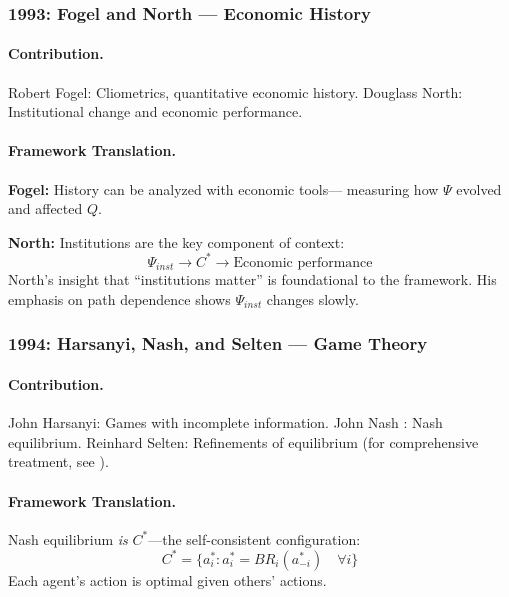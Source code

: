 \documentclass[12pt,a4paper]{article}
\begin{document}
\subsubsection{1993: Fogel and North --- Economic History}

\paragraph{Contribution.}
Robert Fogel: Cliometrics, quantitative economic history.
Douglass North: Institutional change and economic performance.

\paragraph{Framework Translation.}
\textbf{Fogel:} History can be analyzed with economic tools---
measuring how $\Psi$ evolved and affected $Q$.

\textbf{North:} Institutions are the key component of context:
\begin{equation}
  \Psi_{inst} \to C^* \to \text{Economic performance}
\end{equation}
North's insight that ``institutions matter'' is foundational to the framework.
His emphasis on path dependence shows $\Psi_{inst}$ changes slowly.

\subsubsection{1994: Harsanyi, Nash, and Selten --- Game Theory}

\paragraph{Contribution.}
John Harsanyi: Games with incomplete information.
John Nash \citep{nash1950}: Nash equilibrium.
Reinhard Selten: Refinements of equilibrium (for comprehensive treatment, see \citealt{fudenbergtirole1991}).

\paragraph{Framework Translation.}
Nash equilibrium \emph{is} $C^*$---the self-consistent configuration:
\begin{equation}
  C^* = \{a^*_i : a^*_i = BR_i(a^*_{-i}) \quad \forall i\}
\end{equation}
Each agent's action is optimal given others' actions.
\end{document}
